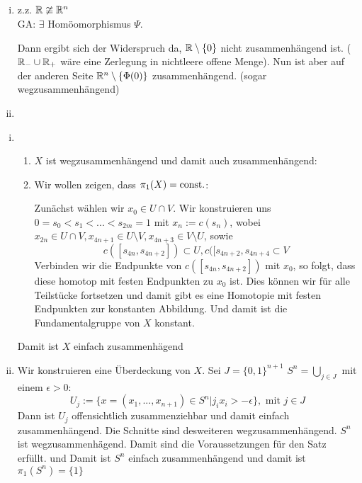 \documentclass{scrartcl}
\begin{document}
\setcounter{section}{11}
\setcounter{aufgabe}{1}
\begin{aufgabe}
\begin{enumerate}[(i)]
\item z.z. $ \mathbb{R} \ncong \mathbb{R}^n $\\
GA: $ \exists $ Homöomorphismus $ \Psi $.

Dann ergibt sich der Widerspruch da, $ \mathbb{R}\setminus\{0\} $ nicht zusammenhängend ist. ($ \mathbb{R}_-\cup \mathbb{R}_+ $ wäre eine Zerlegung in nichtleere offene Menge). Nun ist aber auf der anderen Seite $ \mathbb{R}^n\setminus\{\Phi(0)\} $ zusammenhängend. (sogar wegzusammenhängend)

\item {}
\end{enumerate}
\end{aufgabe}

\begin{aufgabe}
\begin{enumerate}[(i)]
\item 
\begin{enumerate}
\item $ X $ ist wegzusammenhängend und damit auch zusammenhängend:\\

\item Wir wollen zeigen, dass $ \pi_1(X)=\text{const}. $:

Zunächst wählen wir $ x_0\in U\cap V $. Wir konstruieren uns $ 0=s_0<s_1<...<s_{2m}=1 $ mit $ x_n:=c(s_n) $, wobei $ x_{2n}\in U\cap V, x_{4n+1} \in U\setminus V, x_{4n+3}\in V\setminus U $, sowie 
\[
c([s_{4n}, s_{4n+2}])\subset U, c([s_{4n+2}, s_{4n+4}\subset V
\]
Verbinden wir die Endpunkte von $c([s_{4n}, s_{4n+2}])$ mit $ x_0 $, so folgt, dass diese homotop mit festen Endpunkten zu $ x_0 $ ist. Dies können wir für alle Teilstücke fortsetzen und damit gibt es eine Homotopie mit festen Endpunkten zur konstanten Abbildung.  Und damit ist die Fundamentalgruppe von $ X $ konstant.
\end{enumerate}
Damit ist $ X $ einfach zusammenhägend
\item Wir konstruieren eine Überdeckung von $ X $. Sei $ J=\{0,1\}^{n+1} $  $ S^n=\bigcup_{j\in J}$ mit einem $ \epsilon >0 $: 
\[
 U_j:= \{x=(x_1,...,x_{n+1}) \in S^n|j_i x_i > - \epsilon\}, \text{ mit } j \in J
\]
Dann ist $ U_j $ offensichtlich zusammenziehbar und damit einfach zusammenhängend.  Die Schnitte sind desweiteren wegzusammenhängend. $ S^n $ ist wegzusammenhägend. Damit sind die Voraussetzungen für den Satz erfüllt. und Damit ist $ S^n $ einfach zusammenhängend und damit ist $ \pi_1(S^n)=\{1\} $
\end{enumerate}
\end{aufgabe}
\end{document}
